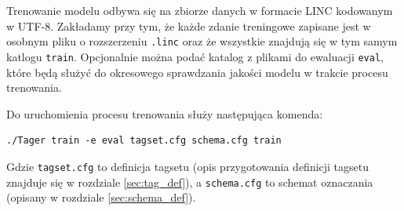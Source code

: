 \documentclass[a4paper,10]{article}
\begin{document}
Trenowanie modelu odbywa się na zbiorze danych w formacie LINC
kodowanym w UTF-8. Zakładamy przy tym, że każde zdanie treningowe
zapisane jest w osobnym pliku o rozszerzeniu \verb|.linc| oraz
że wszystkie znajdują się w tym samym katlogu \verb|train|.
Opcjonalnie można podać katalog z plikami do ewaluacji \verb|eval|,
które będą służyć do okresowego sprawdzania jakości modelu w trakcie
procesu trenowania.

Do uruchomienia procesu trenowania służy następująca komenda:
\begin{verbatim}
./Tager train -e eval tagset.cfg schema.cfg train
\end{verbatim}
Gdzie \verb|tagset.cfg| to definicja tagsetu (opis przygotowania
definicji tagsetu znajduje się w rozdziale \ref{sec:tag_def}),
a \verb|schema.cfg| to schemat oznaczania (opisany w rozdziale
\ref{sec:schema_def}).
\end{document}
